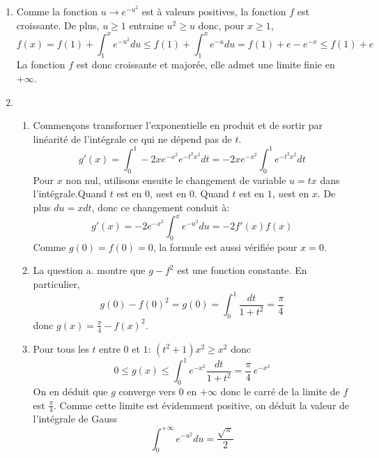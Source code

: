 \begin{enumerate}
 \item Comme la fonction $u\rightarrow e^{-u^2}$ est à valeurs positives, la fonction $f$ est croissante. De plus, $u\geq1$ entraine $u^2\geq u$ donc, pour $x\geq 1$,
\begin{displaymath}
 f(x) = f(1)+\int_1^x e^{-u^2}du \leq f(1)+\int_1^x e^{-u}du= f(1) + e -e^{-x}\leq f(1)+e 
\end{displaymath}
La fonction $f$ est donc croissante et majorée, elle admet une limite finie en $+\infty$.

 \item
\begin{enumerate}
 \item Commençons transformer l'exponentielle en produit et de sortir par linéarité de l'intégrale ce qui ne dépend pas de $t$.
\begin{displaymath}
 g'(x)=\int_0^1-2xe^{-x^2}e^{-t^2x^2}dt=-2xe^{-x^2}\int_0^1e^{-t^2x^2}dt
\end{displaymath}
Pour $x$ non nul, utilisons ensuite le changement de variable $u=tx$ dans l'intégrale.Quand $t$ est en $0$, $u$est en $0$. Quand $t$ est en $1$, $u$est en $x$. De plus $du=xdt$, donc ce changement conduit à:
\begin{displaymath}
 g'(x)=-2e^{-x^2}\int_0^xe^{-u^2}du = -2f'(x)f(x)
\end{displaymath}
Comme $g(0)=f(0)=0$, la formule est aussi vérifiée pour $x=0$.
 \item La question a. montre que $g-f^2$ est une fonction constante. En particulier,
\begin{displaymath}
 g(0)-f(0)^2=g(0)=\int_0^1\frac{dt}{1+t^2}=\frac{\pi}{4}
\end{displaymath}
donc $g(x)=\frac{\pi}{4}-f(x)^2$.
 \item Pour tous les $t$ entre $0$ et $1$: $(t^2+1)x^2\geq x^2$ donc
\begin{displaymath}
 0\leq g(x)\leq \int_0^1 e^{-x^2}\frac{dt}{1+t^2}=\frac{\pi}{4}\,e^{-x^2}
\end{displaymath}
On en déduit que $g$ converge vers $0$ en $+\infty$ donc le carré de la limite de $f$ est $\frac{\pi}{4}$. Comme cette limite est évidemment positive, on déduit la valeur de l'intégrale de Gauss
\begin{displaymath}
 \int_0^{+\infty}e^{-u^2}du = \frac{\sqrt{\pi}}{2}
\end{displaymath}
\end{enumerate}


\end{enumerate}
